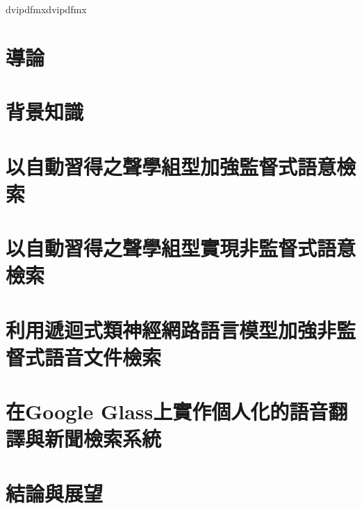 \documentclass[12pt, a4paper]{ntuthesis}
\newcommand\mydvipdfmxflow{dvipdfmx}
\newcommand\myworkflow{dvipdfmx}  %
\newcommand\myworkflow{dvipdfmx}  %
\newcommand\myworkflow{pdftex}  %
\newcommand\myworkflow{dvipdfmx}  %
\begin{document}
\begin{CJK}{UTF8}{bsmi}   %

\ifx\myworkflow\mydvipdfmxflow
\fi

\CJKindent  %








\chapter{導論}
  
\chapter{背景知識}
  
\chapter{以自動習得之聲學組型加強監督式語意檢索}
  
\chapter{以自動習得之聲學組型實現非監督式語意檢索}
  
\chapter{利用遞迴式類神經網路語言模型加強非監督式語音文件檢索}
  
\chapter{在Google Glass上實作個人化的語音翻譯與新聞檢索系統}
  
\chapter{結論與展望}
  



\clearpage %
\end{CJK}  %
\end{document}
